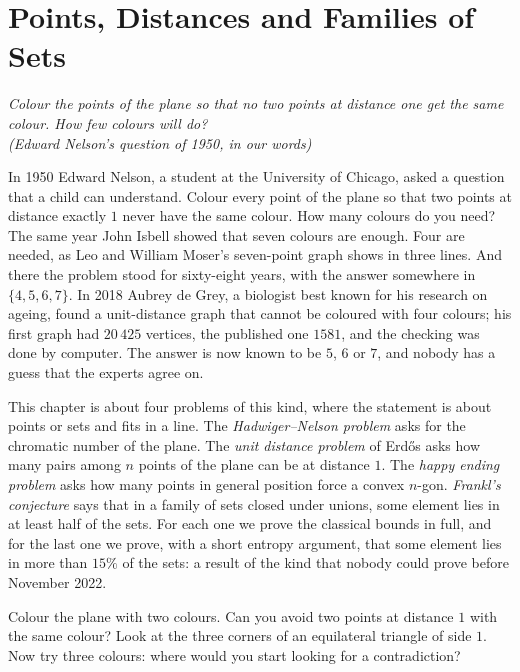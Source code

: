 \chapter{Points, Distances and Families of Sets}\label{conjectures:ch:geometric}

\begin{center}\itshape
Colour the points of the plane so that no two points at distance one get the same colour. How few colours will do?\\
\upshape(Edward Nelson's question of 1950, in our words)
\end{center}

In 1950 Edward Nelson, a student at the University of Chicago, asked a question that a child can understand. Colour every point of the plane so that
two points at distance exactly $1$ never have the same colour. How many colours do you need? The same year John Isbell showed that seven colours are
enough. Four are needed, as Leo and William Moser's seven-point graph shows in three lines. And there the problem stood for sixty-eight years, with the
answer somewhere in $\{4,5,6,7\}$. In 2018 Aubrey de Grey, a biologist best known for his research on ageing, found a unit-distance graph that cannot be
coloured with four colours; his first graph had $20\,425$ vertices, the published one $1581$, and the checking was done by computer. The answer is now
known to be $5$, $6$ or $7$, and nobody has a guess that the experts agree on.

This chapter is about four problems of this kind, where the statement is about points or sets and fits in a line. The \emph{Hadwiger--Nelson problem}
asks for the chromatic number of the plane. The \emph{unit distance problem} of Erd\H os asks how many pairs among $n$ points of the plane can be at
distance $1$. The \emph{happy ending problem} asks how many points in general position force a convex $n$-gon. \emph{Frankl's conjecture} says that in a
family of sets closed under unions, some element lies in at least half of the sets. For each one we prove the classical bounds in full, and for the last
one we prove, with a short entropy argument, that some element lies in more than $15\%$ of the sets: a result of the kind that nobody could prove before
November 2022.

\begin{think}
Colour the plane with two colours. Can you avoid two points at distance $1$ with the same colour? Look at the three corners of an equilateral triangle
of side $1$. Now try three colours: where would you start looking for a contradiction?
\end{think}

